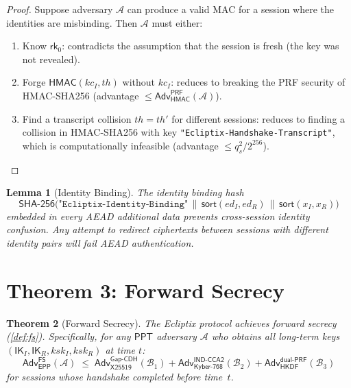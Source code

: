 \documentclass[11pt,a4paper]{article}
\newtheorem{theorem}{Theorem}[section]
\newtheorem{lemma}[theorem]{Lemma}
\theoremstyle{definition}
\theoremstyle{remark}
\newcommand{\ppt}{\mathsf{PPT}}
\newcommand{\adv}{\mathsf{Adv}}
\newcommand{\advA}{\mathcal{A}}
\newcommand{\advB}{\mathcal{B}}
\newcommand{\HKDF}{\mathsf{HKDF}}
\newcommand{\HMAC}{\mathsf{HMAC}}
\newcommand{\SHA}{\mathsf{SHA\text{-}256}}
\renewcommand{\DH}{\mathsf{X25519}}
\newcommand{\KEM}{\mathsf{Kyber\text{-}768}}
\newcommand{\GapCDH}{\mathsf{Gap\text{-}CDH}}
\newcommand{\INDCCA}{\mathsf{IND\text{-}CCA2}}
\newcommand{\PRF}{\mathsf{PRF}}
\newcommand{\dualPRF}{\mathsf{dual\text{-}PRF}}
\newcommand{\IK}{\mathsf{IK}}
\newcommand{\rk}{\mathsf{rk}}
\newcommand{\concat}{\,\|\,}
\begin{document}
\begin{proof}
Suppose adversary $\advA$ can produce a valid MAC for a session where the
identities are misbinding.  Then $\advA$ must either:
\begin{enumerate}[nosep]
  \item Know $\rk_0$: contradicts the assumption that the session is fresh
        (the key was not revealed).
  \item Forge $\HMAC(\mathit{kc}_I, \mathit{th})$ without $\mathit{kc}_I$:
        reduces to breaking the PRF security of HMAC-SHA256 (advantage
        $\leq \adv^{\PRF}_{\HMAC}(\advA)$).
  \item Find a transcript collision $\mathit{th} = \mathit{th}'$ for different
        sessions: reduces to finding a collision in HMAC-SHA256 with key
        \texttt{"Ecliptix-Handshake-Transcript"}, which is computationally
        infeasible (advantage $\leq q_s^2 / 2^{256}$). \qedhere
\end{enumerate}
\end{proof}

\begin{lemma}[Identity Binding]
\label{lem:identity}
The identity binding hash
\[
  \SHA\bigl(\texttt{"Ecliptix-Identity-Binding"} \concat
  \mathsf{sort}(\mathit{ed}_I, \mathit{ed}_R) \concat
  \mathsf{sort}(\mathit{x}_I, \mathit{x}_R)\bigr)
\]
embedded in every AEAD additional data prevents cross-session identity confusion.  Any attempt to
redirect ciphertexts between sessions with different identity pairs will fail
AEAD authentication.
\end{lemma}


\section{Theorem 3: Forward Secrecy}
\label{sec:thm3}

\begin{theorem}[Forward Secrecy]
\label{thm:fs}
The Ecliptix protocol achieves forward secrecy (\cref{def:fs}).  Specifically,
for any $\ppt$ adversary $\advA$ who obtains all long-term keys
$(\IK_I, \IK_R, \mathit{ksk}_I, \mathit{ksk}_R)$ at time $t$:
\[
  \adv^{\mathsf{FS}}_{\mathsf{EPP}}(\advA)
  \;\leq\;
  \adv^{\GapCDH}_{\DH}(\advB_1) +
  \adv^{\INDCCA}_{\KEM}(\advB_2) +
  \adv^{\dualPRF}_{\HKDF}(\advB_3)
\]
for sessions whose handshake completed before time~$t$.
\end{theorem}
\end{document}
